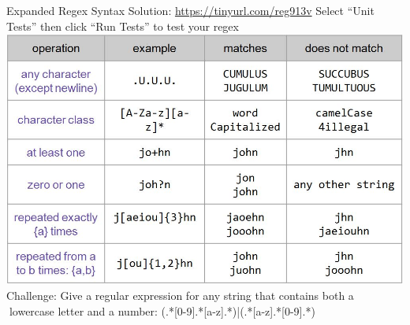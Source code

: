 \documentclass[aspectratio=169]{../latex_main/tntbeamer}  %
\begin{document}
	
	\begin{frame}{Expanded Regex Syntax Solution: \url{https://tinyurl.com/reg913v}}
	   Select “Unit Tests” then click “Run Tests” to test your regex\\ \includegraphics[scale=.3]{Bild13} \\
	  Challenge: Give a regular expression for any string that contains both a lowercase letter and a number: (.*[0-9].*[a-z].*)|(.*[a-z].*[0-9].*)

	\end{frame}
\end{document}
